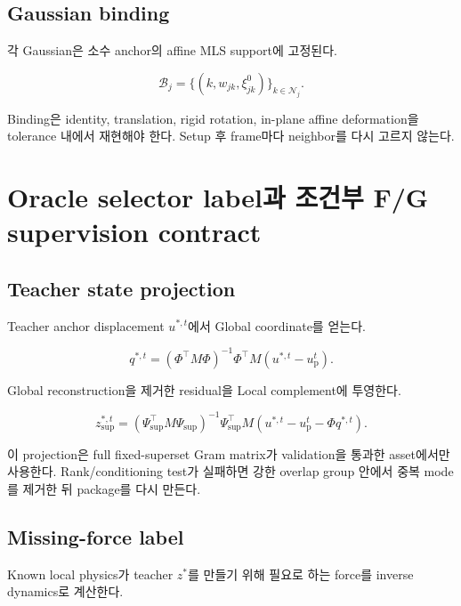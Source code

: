 \documentclass[11pt,a4paper]{article}
\begin{document}
\subsection{Gaussian binding}

각 Gaussian은 소수 anchor의 affine MLS support에 고정된다.

\begin{equation}
  \mathcal B_j
  =
  \{(k,w_{jk},\xi_{jk}^0)\}_{k\in\mathcal N_j}.
\end{equation}

Binding은 identity, translation, rigid rotation,
in-plane affine deformation을 tolerance 내에서 재현해야 한다.
Setup 후 frame마다 neighbor를 다시 고르지 않는다.

\section{Oracle selector label과 조건부 F/G supervision contract}

\subsection{Teacher state projection}

Teacher anchor displacement \(u^{*,t}\)에서 Global coordinate를 얻는다.

\begin{equation}
  q^{*,t}
  =
  (\Phi^\top M\Phi)^{-1}\Phi^\top M
  (u^{*,t}-u_{\mathrm p}^t).
\end{equation}

Global reconstruction을 제거한 residual을 Local complement에 투영한다.

\begin{equation}
  z_{\mathrm{sup}}^{*,t}
  =
  (\Psi_{\mathrm{sup}}^\top M\Psi_{\mathrm{sup}})^{-1}
  \Psi_{\mathrm{sup}}^\top M
  (u^{*,t}-u_{\mathrm p}^t-\Phi q^{*,t}).
\end{equation}

이 projection은 full fixed-superset Gram matrix가 validation을 통과한 asset에서만 사용한다.
Rank/conditioning test가 실패하면 강한 overlap group 안에서 중복 mode를 제거한 뒤 package를 다시 만든다.

\subsection{Missing-force label}

Known local physics가 teacher \(z^*\)를 만들기 위해 필요로 하는 force를 inverse dynamics로 계산한다.
\end{document}
